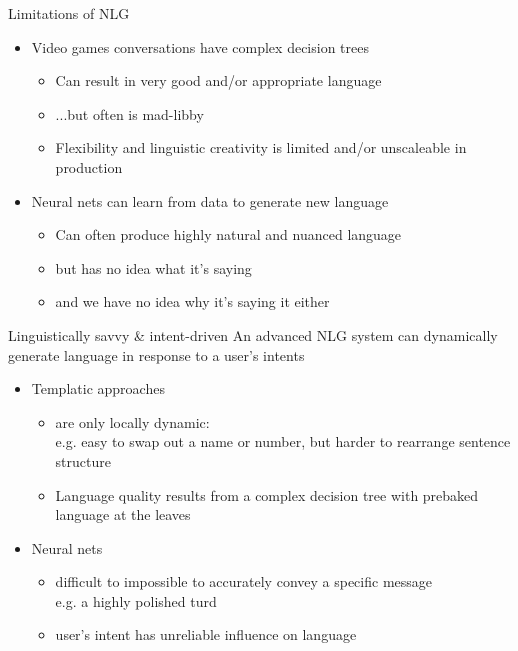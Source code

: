 \documentclass[10pt, compress]{beamer}
\begin{document}
\begin{frame}{Limitations of NLG}
	\begin{itemize}
		\item Video games conversations have complex decision trees	\pause
		\begin{itemize}
			\item Can result in very good and/or appropriate language
			\item ...but often is mad-libby
			\item Flexibility and linguistic creativity is limited and/or unscaleable in production
		\end{itemize}

		\pause

		\item Neural nets can learn from data to generate new language\pause
		\begin{itemize}
			\item Can often produce highly natural and nuanced language
			\item but has no idea what it's saying
			\item and we have no idea why it's saying it either
		\end{itemize}
	\end{itemize}
\end{frame}

\begin{frame}{Linguistically savvy \& intent-driven}
	An advanced NLG system can dynamically generate language in response to a user's intents

	\begin{itemize}
		\item Templatic approaches
		\begin{itemize} 
			\item are only locally dynamic:\\
				e.g. easy to swap out a name or number, but harder to rearrange sentence structure
			\item Language quality results from a complex decision tree with prebaked language at the leaves
		\end{itemize}

		\item Neural nets
		\begin{itemize}
			\item difficult to impossible to accurately convey a specific message\\ \pause
				e.g. a highly polished turd
			\item user's intent has unreliable influence on language
		\end{itemize}
	\end{itemize}
\end{frame}
\end{document}
